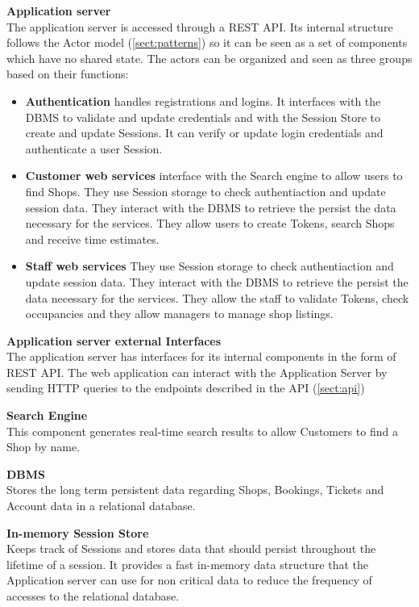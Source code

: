 \textbf{Application server}\\
The application server is accessed through a REST API. Its internal structure follows the Actor model (\ref{sect:patterns}) so it can be seen as a set of components which have no shared state. The actors can be organized and seen as three groups based on their functions:
\begin{itemize}
    \item \textbf{Authentication} handles registrations and logins. It interfaces with the DBMS to validate and update credentials and with the Session Store to create and update Sessions. It can verify or update login credentials and authenticate a user Session.
    \item \textbf{Customer web services} interface with the Search engine to allow users to find Shops. They use Session storage to check authentiaction and update session data. They interact with the DBMS to retrieve the persist the data necessary for the services. They allow users to create Tokens, search Shops and receive time estimates.
    \item \textbf{Staff web services} They use Session storage to check authentiaction and update session data. They interact with the DBMS to retrieve the persist the data necessary for the services. They allow the staff to validate Tokens, check occupancies and they allow managers to manage shop listings.

\end{itemize}
\textbf{Application server external Interfaces}\\
The application server has interfaces for its internal components in the form of REST API. The web application can interact with the Application Server by sending HTTP queries to the endpoints described in the API (\ref{sect:api})

\textbf{Search Engine}\\ This component generates real-time search results to allow Customers to find a Shop by name.

\textbf{DBMS}\\ Stores the long term persistent data regarding Shops, Bookings, Tickets and Account data in a relational database.

\textbf{In-memory Session Store}\\ Keeps track of Sessions and stores data that should persist throughout the lifetime of a session. It provides a fast in-memory data structure that the Application server can use for non critical data to reduce the frequency of accesses to the relational database.

